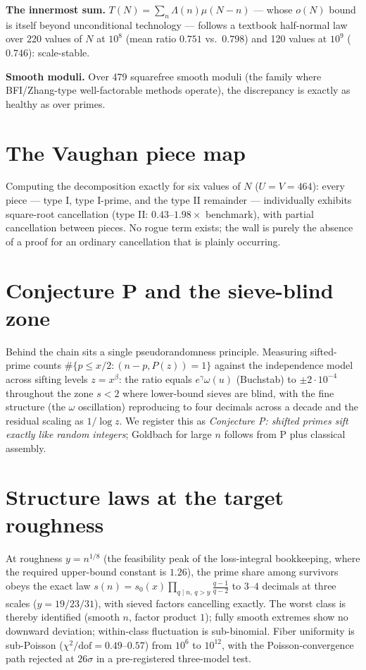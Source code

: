 \documentclass[11pt]{article}
\theoremstyle{definition}
\begin{document}
\textbf{The innermost sum.} $T(N) = \sum_n \Lambda(n)\mu(N-n)$ --- whose
$o(N)$ bound is itself beyond unconditional technology --- follows a
textbook half-normal law over 220 values of $N$ at $10^8$ (mean ratio
$0.751$ vs.\ $0.798$) and 120 values at $10^9$ ($0.746$): scale-stable.

\textbf{Smooth moduli.} Over 479 squarefree smooth moduli (the family
where BFI/Zhang-type well-factorable methods operate), the discrepancy
is exactly as healthy as over primes.

\section{The Vaughan piece map}\label{sec:pieces}

Computing the decomposition exactly for six values of $N$ ($U = V =
464$): every piece --- type I, type I-prime, and the type II remainder ---
individually exhibits square-root cancellation (type II: $0.43$--$1.98
\times$ benchmark), with partial cancellation between pieces. No rogue
term exists; the wall is purely the absence of a proof for an ordinary
cancellation that is plainly occurring.

\section{Conjecture P and the sieve-blind zone}

Behind the chain sits a single pseudorandomness principle. Measuring
sifted-prime counts $\#\{p \le x/2 : (n-p, P(z)) = 1\}$ against the
independence model across sifting levels $z = x^\beta$: the ratio equals
$e^\gamma \omega(u)$ (Buchstab) to $\pm 2\cdot 10^{-4}$ throughout the
zone $s < 2$ where lower-bound sieves are blind, with the fine structure
(the $\omega$ oscillation) reproducing to four decimals across a decade
and the residual scaling as $1/\log z$. We register this as
\emph{Conjecture P: shifted primes sift exactly like random integers};
Goldbach for large $n$ follows from P plus classical assembly.

\section{Structure laws at the target roughness}

At roughness $y = n^{1/8}$ (the feasibility peak of the loss-integral
bookkeeping, where the required upper-bound constant is $1.26$), the
prime share among survivors obeys the exact law $s(n) = s_0(x) \prod_{q
\mid n,\, q > y} \frac{q-1}{q-2}$ to $3$--$4$ decimals at three scales
($y = 19/23/31$), with sieved factors cancelling exactly. The worst
class is thereby identified (smooth $n$, factor product $1$); fully
smooth extremes show no downward deviation; within-class fluctuation is
sub-binomial. Fiber uniformity is sub-Poisson ($\chi^2/\mathrm{dof} =
0.49$--$0.57$) from $10^6$ to $10^{12}$, with the Poisson-convergence
path rejected at $26\sigma$ in a pre-registered three-model test.
\end{document}
